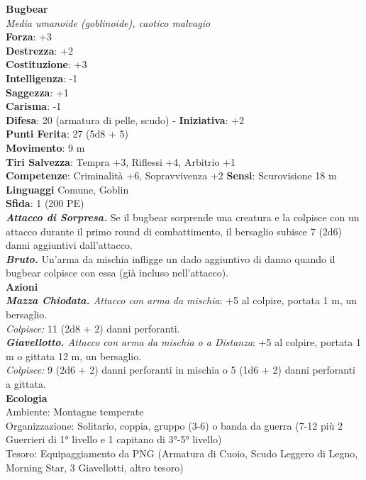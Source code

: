 \begin{multicols}{2}
\medskip\textbf{Bugbear}\\
\emph{Media umanoide (goblinoide), caotico malvagio}\\
\textbf{Forza}: +3\\
\textbf{Destrezza}: +2\\
\textbf{Costituzione}: +3\\
\textbf{Intelligenza}: -1\\
\textbf{Saggezza}: +1\\
\textbf{Carisma}: -1\\
\textbf{Difesa}: 20 (armatura di pelle, scudo) - \textbf{Iniziativa}: +2\\
\textbf{Punti Ferita}: 27 (5d8 + 5)\\
\textbf{Movimento}: 9 m\\
\textbf{Tiri Salvezza}: Tempra +3, Riflessi +4, Arbitrio +1\\
\textbf{Competenze}: Criminalità +6, Sopravvivenza +2
\textbf{Sensi}: Scurovisione 18 m \\
\textbf{Linguaggi} Comune, Goblin\\
\textbf{Sfida}: 1 (200 PE)\smallskip\\
\emph{\textbf{Attacco di Sorpresa.}} Se il bugbear sorprende una creatura e la colpisce con un attacco durante il primo round di combattimento, il bersaglio subisce 7 (2d6) danni aggiuntivi dall'attacco.\\
\emph{\textbf{Bruto.}} Un'arma da mischia infligge un dado aggiuntivo di danno quando il bugbear colpisce con essa (già incluso nell'attacco).\\
\smallskip\textbf{Azioni}\\
\emph{\textbf{Mazza Chiodata.} Attacco con arma da mischia}: +5 al colpire, portata 1 m, un bersaglio.\\
\emph{Colpisce:} 11 (2d8 + 2) danni perforanti.\\
\emph{\textbf{Giavellotto.} Attacco con arma da mischia o a Distanza}: +5 al colpire, portata 1 m o gittata 12 m, un bersaglio.\\
\emph{Colpisce:} 9 (2d6 + 2) danni perforanti in mischia o 5 (1d6 + 2) danni perforanti a gittata.\\
\textbf{Ecologia}\\
Ambiente: Montagne temperate\\
Organizzazione: Solitario, coppia, gruppo (3-6) o banda da guerra (7-12 più 2 Guerrieri di 1° livello e 1 capitano di 3°-5° livello)\\
Tesoro: Equipaggiamento da PNG (Armatura di Cuoio, Scudo Leggero di Legno, Morning Star, 3 Giavellotti, altro tesoro)\\

\end{multicols}
